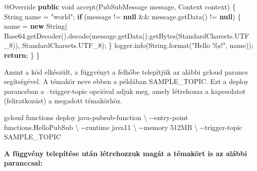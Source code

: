 \documentclass[
]{article}
\newenvironment{Shaded}{}{}
\newcommand{\AttributeTok}[1]{\textcolor[rgb]{0.49,0.56,0.16}{#1}}
\newcommand{\BuiltInTok}[1]{\textcolor[rgb]{0.00,0.50,0.00}{#1}}
\newcommand{\ControlFlowTok}[1]{\textcolor[rgb]{0.00,0.44,0.13}{\textbf{#1}}}
\newcommand{\DataTypeTok}[1]{\textcolor[rgb]{0.56,0.13,0.00}{#1}}
\newcommand{\ExtensionTok}[1]{#1}
\newcommand{\FunctionTok}[1]{\textcolor[rgb]{0.02,0.16,0.49}{#1}}
\newcommand{\KeywordTok}[1]{\textcolor[rgb]{0.00,0.44,0.13}{\textbf{#1}}}
\newcommand{\NormalTok}[1]{#1}
\newcommand{\OperatorTok}[1]{\textcolor[rgb]{0.40,0.40,0.40}{#1}}
\newcommand{\SpecialCharTok}[1]{\textcolor[rgb]{0.25,0.44,0.63}{#1}}
\newcommand{\StringTok}[1]{\textcolor[rgb]{0.25,0.44,0.63}{#1}}
\begin{document}
\begin{Shaded}
\begin{Highlighting}[]
  \AttributeTok{@Override}
  \KeywordTok{public} \DataTypeTok{void} \FunctionTok{accept}\OperatorTok{(}\NormalTok{PubSubMessage message}\OperatorTok{,} \BuiltInTok{Context}\NormalTok{ context}\OperatorTok{)} \OperatorTok{\{}
    \BuiltInTok{String}\NormalTok{ name }\OperatorTok{=} \StringTok{"world"}\OperatorTok{;}
    \ControlFlowTok{if} \OperatorTok{(}\NormalTok{message }\OperatorTok{!=} \KeywordTok{null} \OperatorTok{\&\&}\NormalTok{ message}\OperatorTok{.}\FunctionTok{getData}\OperatorTok{()} \OperatorTok{!=} \KeywordTok{null}\OperatorTok{)} \OperatorTok{\{}
\NormalTok{      name }\OperatorTok{=} \KeywordTok{new} \BuiltInTok{String}\OperatorTok{(}
\NormalTok{        Base64}\OperatorTok{.}\FunctionTok{getDecoder}\OperatorTok{().}\FunctionTok{decode}\OperatorTok{(}\NormalTok{message}\OperatorTok{.}\FunctionTok{getData}\OperatorTok{().}\FunctionTok{getBytes}\OperatorTok{(}\NormalTok{StandardCharsets}\OperatorTok{.}\FunctionTok{UTF\_8}\OperatorTok{)),}
\NormalTok{        StandardCharsets}\OperatorTok{.}\FunctionTok{UTF\_8}\OperatorTok{);}
    \OperatorTok{\}}
\NormalTok{    logger}\OperatorTok{.}\FunctionTok{info}\OperatorTok{(}\BuiltInTok{String}\OperatorTok{.}\FunctionTok{format}\OperatorTok{(}\StringTok{"Hello }\SpecialCharTok{\%s}\StringTok{!"}\OperatorTok{,}\NormalTok{ name}\OperatorTok{));}
    \ControlFlowTok{return}\OperatorTok{;}
  \OperatorTok{\}}
\OperatorTok{\}}
\end{Highlighting}
\end{Shaded}

Amint a kód elkészült, a függvényt a felhőbe telepítjük az alábbi gcloud
parancs segítségével. A témakör neve ebben a példában SAMPLE\_TOPIC. Ezt
a deploy parancsban a --trigger-topic opcióval adjuk meg, amely
létrehozza a kapcsolatot (feliratkozást) a megadott témakörhöz.

\begin{Shaded}
\begin{Highlighting}[]
\ExtensionTok{gcloud}\NormalTok{ functions deploy java{-}pubsub{-}function }\DataTypeTok{\textbackslash{}}
\NormalTok{{-}{-}entry{-}point functions.HelloPubSub }\DataTypeTok{\textbackslash{}}
\NormalTok{{-}{-}runtime java11 }\DataTypeTok{\textbackslash{}}
\NormalTok{{-}{-}memory 512MB }\DataTypeTok{\textbackslash{}}
\NormalTok{{-}{-}trigger{-}topic SAMPLE\_TOPIC}
\end{Highlighting}
\end{Shaded}

\textbf{A függvény telepítése után létrehozzuk magát a témakört is az
alábbi paranccsal:}
\end{document}
